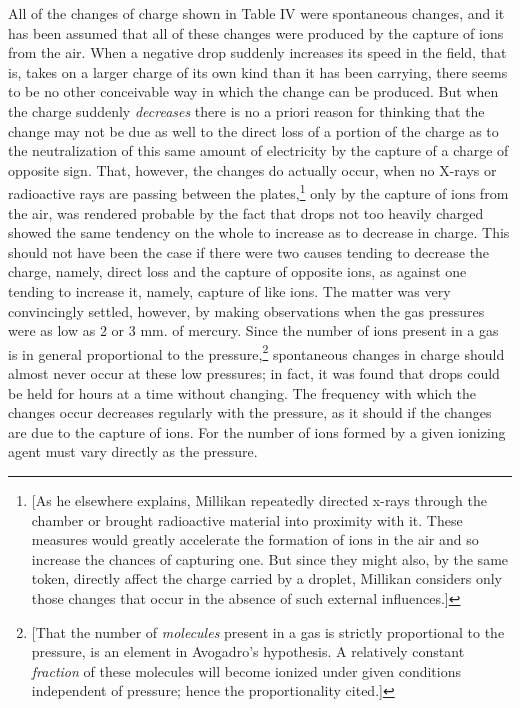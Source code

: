 All of the changes of charge shown in Table IV were spontaneous changes,
and it has been assumed that all of these changes were produced by the
capture of ions from the air. When a negative drop suddenly increases
its speed in the field, that is, takes on a larger charge of its own
kind than it has been carrying, there seems to be no other conceivable
way in which the change can be produced. But when the charge suddenly
\emph{decreases} there is no a priori reason for thinking that the
change may not be due as well to the direct loss of a portion of the
charge as to the neutralization of this same amount of electricity by
the capture of a charge of opposite sign. That, however, the changes do
actually occur, when no X-rays or radioactive rays are passing between
the plates,\footnote{{[}As he elsewhere explains, Millikan repeatedly
  directed x-rays through the chamber or brought radioactive material
  into proximity with it. These measures would greatly accelerate the
  formation of ions in the air and so increase the chances of capturing
  one. But since they might also, by the same token, directly affect the
  charge carried by a droplet, Millikan considers only those changes
  that occur in the absence of such external influences.{]}} only by the
capture of ions from the air, was rendered probable by the fact that
drops not too heavily charged showed the same tendency on the whole to
increase as to decrease in charge. This should not have been the case if
there were two causes tending to decrease the charge, namely, direct
loss and the capture of opposite ions, as against one tending to
increase it, namely, capture of like ions. The matter was very
convincingly settled, however, by making observations when the gas
pressures were as low as 2 or 3 mm. of mercury. Since the number of ions
present in a gas is in general proportional to the pressure,\footnote{{[}That
  the number of \emph{molecules} present in a gas is strictly
  proportional to the pressure, is an element in Avogadro's hypothesis.
  A relatively constant \emph{fraction} of these molecules will become
  ionized under given conditions independent of pressure; hence the
  proportionality cited.{]}} spontaneous changes in charge should almost
never occur at these low pressures; in fact, it was found that drops
could be held for hours at a time without changing. The frequency with
which the changes occur decreases regularly with the pressure, as it
should if the changes are due to the capture of ions. For the number of
ions formed by a given ionizing agent must vary directly as the
pressure.

